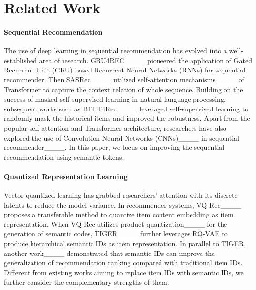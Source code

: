 \section{Related Work}
\paragraph{\textbf{Sequential Recommendation}} The use of deep learning in sequential recommendation has evolved into a well-established area of research. GRU4REC____ pioneered the application of Gated Recurrent Unit (GRU)-based Recurrent Neural Networks (RNNs) for sequential recommender. Then SASRec____ utilized self-attention mechanisms____ of Transformer to capture the context relation of whole sequence. Building on the success of masked self-supervised learning in natural language processing, subsequent works such as BERT4Rec____ leveraged self-supervised learning to randomly mask the historical items and improved the robustness. Apart from the popular self-attention and Transformer architecture, researchers have also explored the use of Convolution Neural Networks (CNNs)____ in sequential recommender____. In this paper, we focus on improving the sequential recommendation using semantic tokens.

\paragraph{\textbf{Quantized Representation Learning}} Vector-quantized learning has grabbed researchers' attention with its discrete latents to reduce the model variance. In recommender systems, VQ-Rec____ proposes a transferable method to quantize item content embedding as item representation. When VQ-Rec utilizes product quantization____ for the generation of semantic codes, TIGER____ further leverages RQ-VAE to produce hierarchical semantic IDs as item representation. In parallel to TIGER, another work____ demonstrated that semantic IDs can improve the generalization of recommendation ranking compared with traditional item IDs. Different from existing works aiming to replace item IDs with semantic IDs, we further consider the complementary strengths of them.